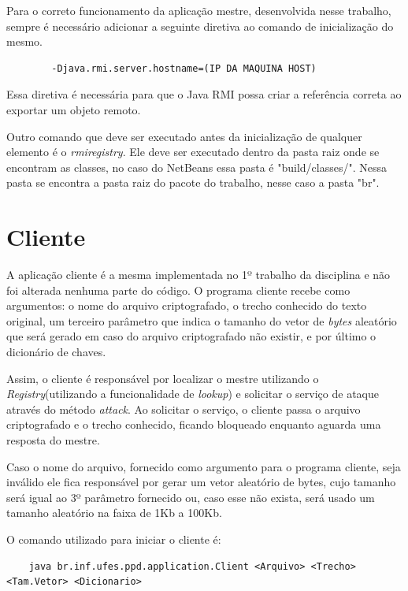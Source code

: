 \documentclass[
	12pt,				%
    oneside,			%
	a4paper,			%
	english,			%
	brazil,				%
	]{abntex2}
\begin{document}
Para o correto funcionamento da aplicação mestre, desenvolvida nesse trabalho, sempre é necessário adicionar a seguinte diretiva ao comando de inicialização do mesmo.

\begin{center}
	\begin{lstlisting}
		-Djava.rmi.server.hostname=(IP DA MAQUINA HOST)
	\end{lstlisting}
\end{center}

Essa diretiva é necessária para que o Java RMI possa criar a referência correta ao exportar um objeto remoto. 

Outro comando que deve ser executado antes da inicialização de qualquer elemento é o \textit{rmiregistry}. Ele deve ser
executado dentro da pasta raiz onde se encontram as classes, no caso do NetBeans essa pasta é "build/classes/".
Nessa pasta se encontra a pasta raiz do pacote do trabalho, nesse caso a pasta "br".

\section{Cliente}

A aplicação cliente é a mesma implementada no 1º trabalho da disciplina e não foi alterada nenhuma parte do código. O programa cliente recebe como argumentos: o nome do arquivo criptografado, o trecho conhecido do texto original, um terceiro parâmetro que indica o tamanho do vetor de \textit{bytes} aleatório que será gerado em caso do arquivo criptografado não existir, e por último o dicionário de chaves.

Assim, o cliente é responsável por localizar o mestre utilizando o \textit{Registry}(utilizando a funcionalidade de \textit{lookup}) e solicitar o serviço de ataque através do método \textit{attack}. Ao solicitar o serviço, o cliente passa o arquivo criptografado e o trecho conhecido, ficando bloqueado enquanto aguarda uma resposta do mestre.

Caso o nome do arquivo, fornecido como argumento para o programa cliente, seja inválido ele fica responsável por gerar um vetor aleatório de bytes, cujo tamanho será igual ao 3º parâmetro fornecido ou, caso esse não exista, será usado um tamanho aleatório na faixa de 1Kb a 100Kb.

O comando utilizado para iniciar o cliente é:

\begin{lstlisting}
	java br.inf.ufes.ppd.application.Client <Arquivo> <Trecho> <Tam.Vetor> <Dicionario>
\end{lstlisting}
\end{document}
